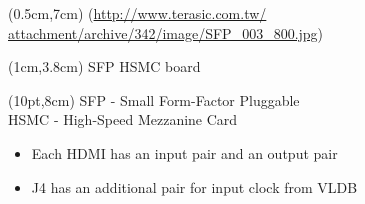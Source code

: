\documentclass[aspectratio=43]{beamer}
\makeatletter
\newenvironment{backgroundblock}[2]{%
  \global\setbox\@backgroundblock=\vbox\bgroup%
    \unvbox\@backgroundblock%
    \vbox to0pt\bgroup\vskip#2\hbox to0pt\bgroup\hskip#1\relax%
}{\egroup\egroup\egroup}
\makeatother
\begin{document}
{\begin{frame}[t]
\begin{textblock*}{\paperwidth}(0.5cm,7cm)
{\tiny \color{gray} (\url{http://www.terasic.com.tw/} \\ \url{attachment/archive/342/image/SFP_003_800.jpg})}
\end{textblock*}

\begin{textblock*}{\paperwidth}(1cm,3.8cm)
{\color{black} SFP HSMC board}
\end{textblock*}

\begin{textblock*}{\paperwidth}(10pt,8cm)
{\small \color{gray} SFP - Small Form-Factor Pluggable \\ HSMC - High-Speed Mezzanine Card}
\end{textblock*}

\begin{itemize}
\item Each HDMI has an input pair and an output pair
\item J4 has an additional pair for input clock from VLDB
\end{itemize}

\end{frame}

}
\end{document}
